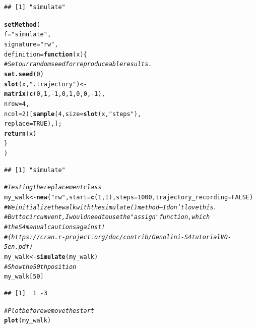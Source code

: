 \documentclass{article}\usepackage[]{graphicx}\usepackage[]{color}
\makeatletter
\newcommand{\hlnum}[1]{\textcolor[rgb]{0.686,0.059,0.569}{#1}}%
\newcommand{\hlstr}[1]{\textcolor[rgb]{0.192,0.494,0.8}{#1}}%
\newcommand{\hlcom}[1]{\textcolor[rgb]{0.678,0.584,0.686}{\textit{#1}}}%
\newcommand{\hlopt}[1]{\textcolor[rgb]{0,0,0}{#1}}%
\newcommand{\hlstd}[1]{\textcolor[rgb]{0.345,0.345,0.345}{#1}}%
\newcommand{\hlkwa}[1]{\textcolor[rgb]{0.161,0.373,0.58}{\textbf{#1}}}%
\newcommand{\hlkwb}[1]{\textcolor[rgb]{0.69,0.353,0.396}{#1}}%
\newcommand{\hlkwc}[1]{\textcolor[rgb]{0.333,0.667,0.333}{#1}}%
\newcommand{\hlkwd}[1]{\textcolor[rgb]{0.737,0.353,0.396}{\textbf{#1}}}%
\newenvironment{kframe}{%
 \def\at@end@of@kframe{}%
 \ifinner\ifhmode%
  \def\at@end@of@kframe{\end{minipage}}%
  \begin{minipage}{\columnwidth}%
 \fi\fi%
 \def\FrameCommand##1{\hskip\@totalleftmargin \hskip-\fboxsep
 \colorbox{shadecolor}{##1}\hskip-\fboxsep
     \hskip-\linewidth \hskip-\@totalleftmargin \hskip\columnwidth}%
 \MakeFramed {\advance\hsize-\width
   \@totalleftmargin\z@ \linewidth\hsize
   \@setminipage}}%
 {\par\unskip\endMakeFramed%
 \at@end@of@kframe}
\newenvironment{knitrout}{}{} %
\makeatother
\begin{document}
\begin{knitrout}
\begin{kframe}
{\ttfamily\noindent\itshape\color{messagecolor}{\#\# Creating a new generic function for 'simulate' in the global environment}}\begin{verbatim}
## [1] "simulate"
\end{verbatim}
\begin{alltt}
\hlkwd{setMethod}\hlstd{(}
  \hlkwc{f}\hlstd{=}\hlstr{"simulate"}\hlstd{,}
  \hlkwc{signature}\hlstd{=}\hlstr{"rw"}\hlstd{,}
  \hlkwc{definition}\hlstd{=}\hlkwa{function}\hlstd{(}\hlkwc{x}\hlstd{)\{}
    \hlcom{# Set our random seed for reproduceable results.}
    \hlkwd{set.seed}\hlstd{(}\hlnum{0}\hlstd{)}
    \hlkwd{slot}\hlstd{(x,}\hlstr{".trajectory"}\hlstd{)} \hlkwb{<-}
      \hlkwd{matrix}\hlstd{(}\hlkwd{c}\hlstd{(}\hlnum{0}\hlstd{,} \hlnum{1}\hlstd{,} \hlopt{-}\hlnum{1}\hlstd{,} \hlnum{0}\hlstd{,} \hlnum{1}\hlstd{,} \hlnum{0}\hlstd{,} \hlnum{0}\hlstd{,} \hlopt{-}\hlnum{1}\hlstd{),}
             \hlkwc{nrow}\hlstd{=}\hlnum{4}\hlstd{,}
             \hlkwc{ncol}\hlstd{=}\hlnum{2}\hlstd{)[}\hlkwd{sample}\hlstd{(}\hlnum{4}\hlstd{,}\hlkwc{size}\hlstd{=}\hlkwd{slot}\hlstd{(x,}\hlstr{"steps"}\hlstd{),}
             \hlkwc{replace}\hlstd{=}\hlnum{TRUE}\hlstd{),];}
    \hlkwd{return}\hlstd{(x)}
  \hlstd{\}}
\hlstd{)}
\end{alltt}
\begin{verbatim}
## [1] "simulate"
\end{verbatim}
\begin{alltt}
\hlcom{# Testing the replacement class}
\hlstd{my_walk} \hlkwb{<-} \hlkwd{new}\hlstd{(}\hlstr{"rw"}\hlstd{,} \hlkwc{start}\hlstd{=}\hlkwd{c}\hlstd{(}\hlnum{1}\hlstd{,}\hlnum{1}\hlstd{),}\hlkwc{steps}\hlstd{=}\hlnum{1000}\hlstd{,}\hlkwc{trajectory_recording}\hlstd{=}\hlnum{FALSE}\hlstd{)}
\hlcom{# We initialize the walk with the simulate() method -- I don't love this.}
\hlcom{# But to circumvent, I would need to use the "assign" function, which}
\hlcom{# the S4 manual cautions against! }
\hlcom{# (https://cran.r-project.org/doc/contrib/Genolini-S4tutorialV0-5en.pdf)}
\hlstd{my_walk} \hlkwb{<-} \hlkwd{simulate}\hlstd{(my_walk)}
\hlcom{# Show the 50th position}
\hlstd{my_walk[}\hlnum{50}\hlstd{]}
\end{alltt}
\begin{verbatim}
## [1]  1 -3
\end{verbatim}
\begin{alltt}
\hlcom{# Plot before we move the start}
\hlkwd{plot}\hlstd{(my_walk)}
\end{alltt}
\end{kframe}

\end{knitrout}
\end{document}
